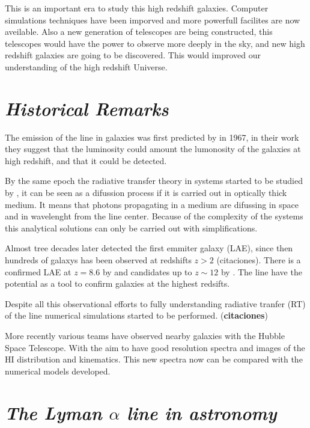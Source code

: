This is an important era to study this high redshift galaxies. Computer 
simulations techniques have been imporved and more powerfull facilites are
now aveilable. Also a new generation of telescopes are being constructed,
this telescopes would have the power to observe more deeply in the sky, 
and new high redshift galaxies are going to be discovered. This would 
improved our understanding of the high redshift Universe. 

\section{\emph{Historical Remarks}}

The emission of the \ly line in galaxies was first predicted by 
\citep{PartridgePeebles} in 1967, in their work they suggest that the \ly luminosity
could amount the lumonosity of the galaxies at high redshift, and that 
it could be detected. 

By the same epoch the radiative transfer theory in \ly systems started to be
 studied by \citep{Osterbrock62, Adams72,Harrington73, Neufeld90},
 it can be seen as a difussion process if it is carried out in 
 optically thick medium. It means that \ly photons propagating 
in a medium are difussing in space and in wavelenght from the line center.   
Because of the complexity of the systems this analytical solutions 
can only be carried out with simplifications. 


Almost tree decades later \citep{DjorgovskiThomson92} detected the first \ly emmiter galaxy (LAE), since then hundreds of galaxys has been  
observed at redshifts $z>2$ (citaciones). There is a confirmed LAE at $z=8.6$ by \citep{Lenhert2010} and candidates up to $z\sim12$ by \citep{Brammer12}. 
The \ly line have the potential as a tool to confirm galaxies at the highest 
redsifts. 

Despite all this observational efforts to fully understanding radiative
tranfer (RT) of the \ly line numerical simulations started to be performed.
({\bf{citaciones}})

More recently various teams \citep{Mas-Hesse09,LARS} have
observed nearby galaxies with the Hubble Space Telescope. With the
aim to have good resolution spectra and images of the HI distribution 
and kinematics. This new spectra now can be compared with the numerical 
models developed.

 

\section{\emph{The Lyman $\alpha$ line in astronomy}}

